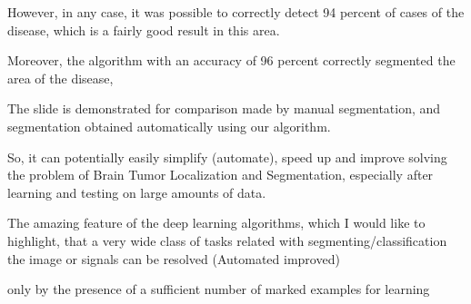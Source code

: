  However, in any case, it was possible to correctly detect 94 percent of cases of the disease, which is a fairly good result in this area.





Moreover, the algorithm with an accuracy of 96 percent correctly segmented the area of the disease, 

The slide is demonstrated for comparison made by manual segmentation, and segmentation obtained automatically using our algorithm.

So, it can potentially easily simplify (automate), speed up and improve solving the problem of Brain Tumor Localization and Segmentation, especially after learning and testing on large amounts of data.


The amazing feature of the deep learning algorithms, which I would like to highlight, that a very wide class of tasks related with segmenting/classification  the image or signals can be resolved (Automated improved) 

only by the presence of a sufficient number of marked examples for learning









